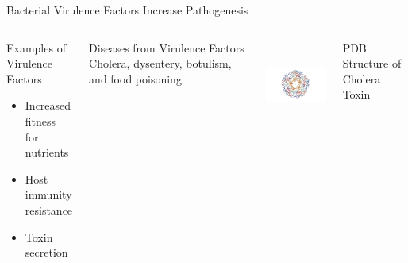 \documentclass[11pt]{beamer}
\begin{document}
	\begin{frame}{Bacterial Virulence Factors Increase Pathogenesis}
	\begin{columns}
	\begin{block}{Examples of Virulence Factors}
		\begin{itemize}
		\item Increased fitness for nutrients
		\item Host immunity resistance
		\item Toxin secretion
		\end{itemize}
	\end{block} 
	
	\begin{block}{Diseases from Virulence Factors}
	Cholera, dysentery, botulism, and food poisoning
	\end{block}
	

	\includegraphics[height=3cm, width=5cm]{cholera.png}

	\vspace{-0.3cm}
	\hspace{0.5cm}	
	\tiny{PDB Structure of Cholera Toxin}
	\end{columns}
	
	\end{frame}
	
	
\end{document}
